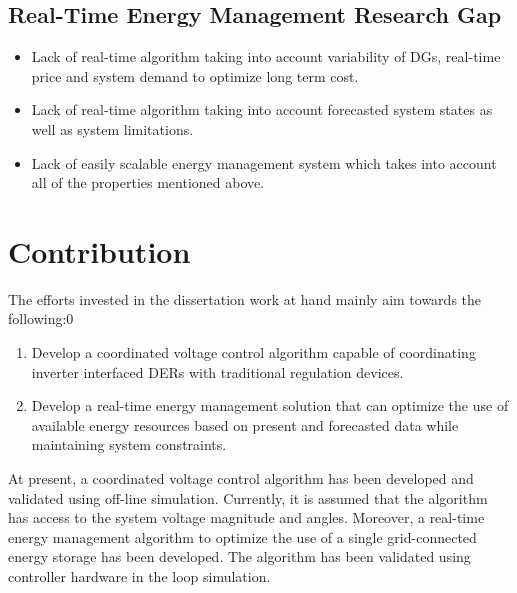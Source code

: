 \subsection{Real-Time Energy Management Research Gap}	
\begin{itemize}
    \item Lack of real-time algorithm taking into account variability of DGs, real-time price and system demand to optimize long term cost.
    \item Lack of real-time algorithm taking into account forecasted system states as well as system limitations.
    \item Lack of easily scalable energy management system which takes into account all of the properties mentioned above.
\end{itemize}

\section{Contribution}
The efforts invested in the dissertation work at hand mainly aim towards the following:0
 
\begin{enumerate}
    \item Develop a coordinated voltage control algorithm capable of coordinating inverter interfaced DERs with traditional regulation devices.
    \item Develop a real-time energy management solution that can optimize the use of available energy resources based on present and forecasted data while maintaining system constraints.
\end{enumerate}

At present, a coordinated voltage control algorithm has been developed and validated using off-line simulation. Currently, it is assumed that the algorithm has access to the system voltage magnitude and angles. Moreover, a real-time energy management algorithm to optimize the use of a single grid-connected energy storage has been developed. The algorithm has been validated using controller hardware in the loop simulation.